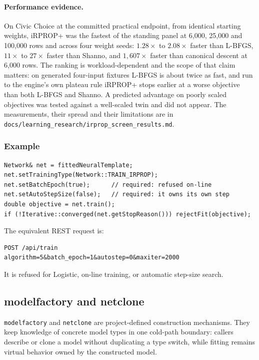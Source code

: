 \paragraph{Performance evidence.}  On Civic Choice at the committed practical
endpoint, from identical starting weights, iRPROP+ was the fastest of the
standing panel at 6,000, 25,000 and 100,000 rows and across four weight seeds:
$1.28\times$ to $2.08\times$ faster than L-BFGS, $11\times$ to $27\times$ faster
than Shanno, and $1{,}607\times$ faster than canonical descent at 6,000 rows.
The ranking is workload-dependent and the scope of that claim matters: on
generated four-input fixtures L-BFGS is about twice as fast, and run to the
engine's own plateau rule iRPROP+ stops earlier at a worse objective than both
L-BFGS and Shanno.  A predicted advantage on poorly scaled objectives was tested
against a well-scaled twin and did not appear.  The measurements, their spread
and their limitations are in
\texttt{docs/learning\_research/irprop\_screen\_results.md}.

\subsubsection{Example}
\begin{verbatim}
Network& net = fittedNeuralTemplate;
net.setTrainingType(Network::TRAIN_IRPROP);
net.setBatchEpoch(true);      // required: refused on-line
net.setAutoStepSize(false);   // required: it owns its own step
double objective = net.train();
if (!Iterative::converged(net.getStopReason())) rejectFit(objective);
\end{verbatim}

The equivalent REST request is:
\begin{verbatim}
POST /api/train
algorithm=5&batch_epoch=1&autostep=0&maxiter=2000
\end{verbatim}
It is refused for Logistic, on-line training, or automatic step-size search.

\subsection{modelfactory and netclone}
\texttt{modelfactory} and \texttt{netclone} are project-defined construction
mechanisms.  They keep knowledge of concrete model types in one cold-path
boundary: callers describe or clone a model without duplicating a type switch,
while fitting remains virtual behavior owned by the constructed model.


